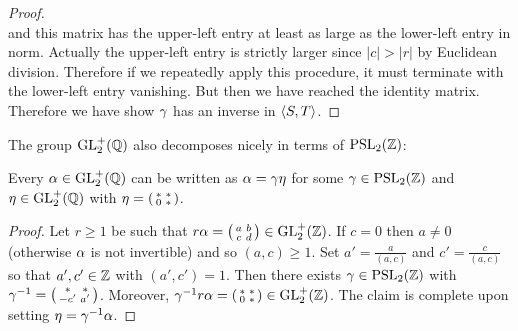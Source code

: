 \begin{proof}
\[      \]
      and this matrix has the upper-left entry at least as large as the lower-left entry in norm. Actually the upper-left entry is strictly larger since $|c| > |r|$ by Euclidean division. Therefore if we repeatedly apply this procedure, it must terminate with the lower-left entry vanishing. But then we have reached the identity matrix. Therefore we have show $\gamma$ has an inverse in $\langle S,T\rangle$.
    \end{proof}

    The group $\mathrm{GL}_{2}^{+}(\mathbb{Q})$ also decomposes nicely in terms of $\mathrm{PSL}_{2}(\mathbb{Z})$:

    \begin{lemma}\label{lem:modular_group_decomposition_lemma}
      Every $\alpha \in \mathrm{GL}_{2}^{+}(\mathbb{Q})$ can be written as $\alpha = \gamma\eta$ for some $\gamma \in \mathrm{PSL}_{2}(\mathbb{Z})$ and $\eta \in \mathrm{GL}_{2}^{+}(\mathbb{Q})$ with $\eta = \begin{psmallmatrix} \ast & \ast \\ 0 & \ast \end{psmallmatrix}$.
    \end{lemma}
    \begin{proof}
      Let $r \ge 1$ be such that $r\alpha = \begin{psmallmatrix} a & b \\ c & d \end{psmallmatrix} \in \mathrm{GL}_{2}^{+}(\mathbb{Z})$. If $c = 0$ then $a \neq 0$ (otherwise $\alpha$ is not invertible) and so $(a,c) \ge 1$. Set $a' = \frac{a}{(a,c)}$ and $c' = \frac{c}{(a,c)}$ so that $a',c' \in \mathbb{Z}$ with $(a',c') = 1$. Then there exists $\gamma \in \mathrm{PSL}_{2}(\mathbb{Z})$ with $\gamma^{-1} = \begin{psmallmatrix} \ast & \ast \\ -c' & a' \end{psmallmatrix}$. Moreover, $\gamma^{-1}r\alpha = \begin{psmallmatrix} \ast & \ast \\ 0 & \ast \end{psmallmatrix} \in \mathrm{GL}_{2}^{+}(\mathbb{Z})$. The claim is complete upon setting $\eta = \gamma^{-1}\alpha$.
    \end{proof}


